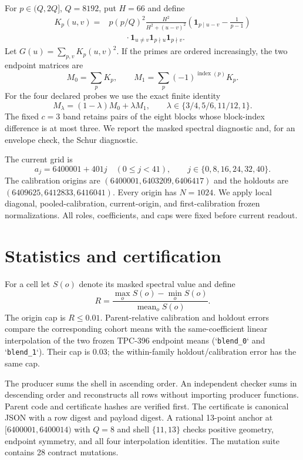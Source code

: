 \documentclass[10pt]{article}
\begin{document}
For $p\in(Q,2Q]$, $Q=8192$, put $H=66$ and define
\begin{align*}
 K_p(u,v)={}&p(p/Q)^2\frac{H^2}{H^2+(u-v)^2}
 \left(\mathbf 1_{p\mid u-v}-\frac{1}{p-1}\right)\\
 &\qquad\cdot\mathbf 1_{u\ne v}\mathbf 1_{p\nmid u}\mathbf 1_{p\nmid v}.
\end{align*}
Let $G(u)=\sum_{p,v}K_p(u,v)^2$.  If the primes are ordered increasingly,
the two endpoint matrices are
\[
 M_0=\sum_pK_p,\qquad
 M_1=\sum_p(-1)^{\operatorname{index}(p)}K_p.
\]
For the four declared probes we use the exact finite identity
\[
 M_\lambda=(1-\lambda)M_0+\lambda M_1,
 \qquad \lambda\in\{3/4,5/6,11/12,1\}.
\]
The fixed $c=3$ band retains pairs of the eight blocks whose block-index
difference is at most three.  We report the masked spectral diagnostic and,
for an envelope check, the Schur diagnostic.

The current grid is
\[
 a_j=6400001+401j\quad(0\leq j<41),
 \qquad j\in\{0,8,16,24,32,40\}.
\]
The calibration origins are $(6400001,6403209,6406417)$ and the holdouts are
$(6409625,6412833,6416041)$.  Every origin has $N=1024$.  We apply local
diagonal, pooled-calibration, current-origin, and first-calibration frozen
normalizations.  All roles, coefficients, and caps were fixed before current
readout.

\section{Statistics and certification}

For a cell let $S(o)$ denote its masked spectral value and define
\[
 R=\frac{\max_oS(o)-\min_oS(o)}{\operatorname{mean}_oS(o)}.
\]
The origin cap is $R\leq0.01$.  Parent-relative calibration and holdout
errors compare the corresponding cohort means with the same-coefficient linear
interpolation of the two frozen TPC-396 endpoint means
(`\texttt{blend\_0}` and `\texttt{blend\_1}`).  Their cap is $0.03$;
the within-family holdout/calibration error has the same cap.

The producer sums the shell in ascending order.  An independent checker sums
in descending order and reconstructs all rows without importing producer
functions.  Parent code and certificate hashes are verified first.  The
certificate is canonical JSON with a row digest and payload digest.  A rational
13-point anchor at $[6400001,6400014)$ with $Q=8$ and shell $\{11,13\}$ checks
positive geometry, endpoint symmetry, and all four interpolation identities.
The mutation suite contains 28 contract mutations.
\end{document}
